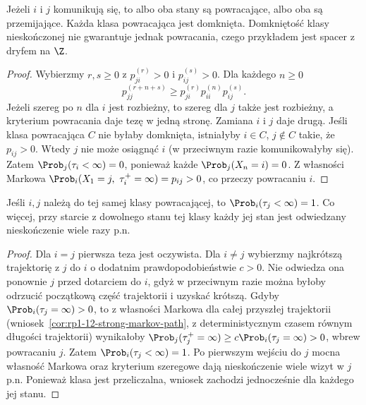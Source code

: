 \begin{stwierdzenie}
Jeżeli $i$ i $j$ komunikują się, to albo oba stany
są powracające, albo oba są przemijające.
Każda klasa powracająca jest domknięta.
Domkniętość klasy nieskończonej nie gwarantuje
jednak powracania, czego przykładem jest spacer
z dryfem na $\Z$.
\end{stwierdzenie}
\begin{proof}
Wybierzmy $r,s\geq0$ z $p_{ji}^{(r)}>0$
i $p_{ij}^{(s)}>0$. Dla każdego $n\geq0$
\[
p_{jj}^{(r+n+s)}\geq p_{ji}^{(r)}
p_{ii}^{(n)}p_{ij}^{(s)}.
\]
Jeżeli szereg po $n$ dla $i$ jest rozbieżny,
to szereg dla $j$ także jest rozbieżny,
a kryterium powracania daje tezę w jedną stronę.
Zamiana $i$ i $j$ daje drugą.
Jeśli klasa powracająca $C$ nie byłaby domknięta,
istniałyby $i\in C$, $j\notin C$ takie, że $p_{ij}>0$.
Wtedy $j$ nie może osiągnąć $i$ (w przeciwnym
razie komunikowałyby się). Zatem
$\Prob_j(\tau_i<\infty)=0$, ponieważ każde
$\Prob_j(X_n=i)=0$. Z własności Markowa
$\Prob_i(X_1=j,\ \tau_i^+=\infty)=p_{ij}>0$,
co przeczy powracaniu $i$.
\end{proof}

\begin{wniosek}
Jeśli $i,j$ należą do tej samej klasy powracającej,
to $\Prob_i(\tau_j<\infty)=1$. Co więcej, przy
starcie z dowolnego stanu tej klasy każdy jej stan
jest odwiedzany nieskończenie wiele razy p.n.
\end{wniosek}
\begin{proof}
Dla $i=j$ pierwsza teza jest oczywista.
Dla $i\ne j$ wybierzmy najkrótszą trajektorię
z $j$ do $i$ o dodatnim prawdopodobieństwie $c>0$.
Nie odwiedza ona ponownie $j$ przed dotarciem do $i$,
gdyż w przeciwnym razie można byłoby odrzucić
początkową część trajektorii i uzyskać krótszą.
Gdyby $\Prob_i(\tau_j=\infty)>0$, to z własności
Markowa dla całej przyszłej trajektorii
(wniosek~\ref{cor:rp1-12-strong-markov-path},
z deterministycznym czasem równym długości trajektorii)
wynikałoby
$\Prob_j(\tau_j^+=\infty)\geq c\Prob_i(\tau_j=\infty)>0$,
wbrew powracaniu $j$. Zatem $\Prob_i(\tau_j<\infty)=1$.
Po pierwszym wejściu do $j$ mocna własność Markowa
oraz kryterium szeregowe dają nieskończenie wiele
wizyt w $j$ p.n. Ponieważ klasa jest przeliczalna,
wniosek zachodzi jednocześnie dla każdego jej stanu.
\end{proof}

